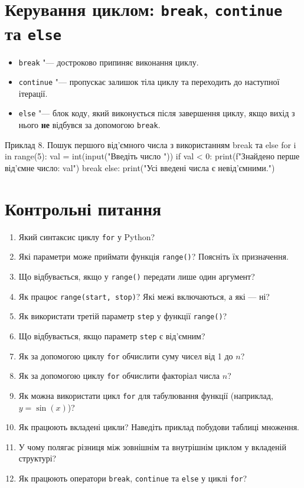 \section{Керування циклом: \texttt{break}, \texttt{continue} та \texttt{else}}

\begin{itemize}
	\item \texttt{break} "--- достроково припиняє виконання циклу.
	\item \texttt{continue} "--- пропускає залишок тіла циклу та переходить до наступної ітерації.
	\item \texttt{else} "--- блок коду, який виконується після завершення циклу, якщо вихід з нього \textbf{не} відбувся за допомогою \texttt{break}.
\end{itemize}

\begin{py}{Приклад 8. Пошук першого від'ємного числа з використанням break та else}
for i in range(5):
    val = int(input("Введіть число "))
    if val < 0:
        print(f"Знайдено перше від'ємне число: {val}")
        break
else:
    print("Усі введені числа є невід'ємними.")
 \end{py}

\section*{Контрольні питання}

\begin{enumerate}
	\item Який синтаксис циклу \texttt{for} у Python?
	\item Які параметри може приймати функція \texttt{range()}? Поясніть їх призначення.
	\item Що відбувається, якщо у \texttt{range()} передати лише один аргумент?
	\item Як працює \texttt{range(start, stop)}? Які межі включаються, а які — ні?
	\item Як використати третій параметр \texttt{step} у функції \texttt{range()}?
	\item Що відбувається, якщо параметр \texttt{step} є від’ємним?
	\item Як за допомогою циклу \texttt{for} обчислити суму чисел від 1 до $n$?
	\item Як за допомогою циклу \texttt{for} обчислити факторіал числа $n$?
	\item Як можна використати цикл \texttt{for} для табулювання функції (наприклад, $y = \sin(x)$)?
	\item Як працюють вкладені цикли? Наведіть приклад побудови таблиці множення.
	\item У чому полягає різниця між зовнішнім та внутрішнім циклом у вкладеній структурі?
	\item Як працюють оператори \texttt{break}, \texttt{continue} та \texttt{else} у циклі \texttt{for}?

\end{enumerate}

